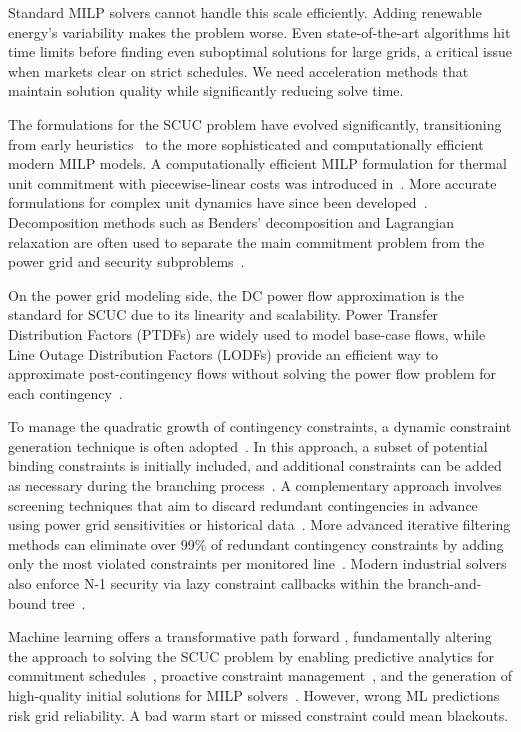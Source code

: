 \documentclass{ieeeaccess}
\begin{document}
Standard MILP solvers cannot handle this scale efficiently. Adding renewable energy's variability makes the problem worse. Even state-of-the-art algorithms hit time limits before finding even suboptimal solutions for large grids, a critical issue when markets clear on strict schedules. We need acceleration methods that maintain solution quality while significantly reducing solve time.

The formulations for the SCUC problem have evolved significantly, transitioning from early heuristics~\cite{Merlin1983} to the more sophisticated and computationally efficient modern MILP models. A computationally efficient MILP formulation for thermal unit commitment with piecewise-linear costs was introduced in~\cite{Carrion2006}. More accurate formulations for complex unit dynamics have since been developed~\cite{Ostrowski2012}. Decomposition methods such as Benders' decomposition and Lagrangian relaxation are often used to separate the main commitment problem from the power grid and security subproblems~\cite{Morales2013, Pan2016}.


On the power grid modeling side, the DC power flow approximation is the standard for SCUC due to its linearity and scalability. Power Transfer Distribution Factors (PTDFs) are widely used to model base-case flows, while Line Outage Distribution Factors (LODFs) provide an efficient way to approximate post-contingency flows without solving the power flow problem for each contingency~\cite{Christie2000, Tejada2018}. 

To manage the quadratic growth of contingency constraints, a dynamic constraint generation technique is often adopted~\cite{Tejada2018}.
 In this approach, a subset of potential binding constraints is initially included, and additional constraints can be added as necessary during the branching process~\cite{Tejada2018}. A complementary approach involves screening techniques that aim to discard redundant contingencies in advance using power grid sensitivities or historical data~\cite{Holzer2024, Porras2023, Pineda2020, He2024screening}. More advanced iterative filtering methods can eliminate over 99\% of redundant contingency constraints by adding only the most violated constraints per monitored line~\cite{Xavier2020CF, Castelli2024b}. Modern industrial solvers also enforce N-1 security via lazy constraint callbacks within the branch-and-bound tree~\cite{Castelli2024b, Qiu2022}.

Machine learning offers a transformative path forward \cite{Bengio2021, Wu2024, Tuo2023}, fundamentally altering the approach to solving the SCUC problem by enabling predictive analytics for commitment schedules~\cite{Xavier2019, Quarm2021}, proactive constraint management~\cite{Donti2021}, and the generation of high-quality initial solutions for MILP solvers~\cite{JimenezCordero2022, Hasan2023}. However, wrong ML predictions risk grid reliability. A bad warm start or missed constraint could mean blackouts.
\end{document}
